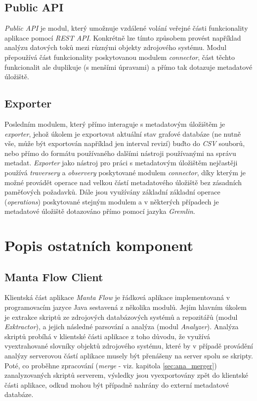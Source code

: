 \subsection{Public API}
\label{sec:ana_public}
\textit{Public API} je modul, který umožnuje vzdálené volání veřejné části funkcionality aplikace pomocí \textit{REST API}. Konkrétně lze tímto způsobem provést například analýzu datových toků mezi různými objekty zdrojového systému. Modul přepoužívá část funkcionality poskytovanou modulem \textit{connector}, část těchto funkcionalit ale duplikuje (s menšími úpravami) a přímo tak dotazuje metadatové úložiště.

\subsection{Exporter}
\label{sec:ana_exporter}
Posledním modulem, který přímo interaguje s metadatovým úložištěm je \textit{exporter}, jehož úkolem je exportovat aktuální stav grafové databáze (ne nutně vše, může být exportován například jen interval revizí) buďto do \textit{CSV} souborů, nebo přímo do formátu používaného dalšími nástroji používanými na správu metadat. \textit{Exporter} jako nástroj pro práci s metadatovým úložištěm nejčastěji používá \textit{traversery} a \textit{observery} poskytované modulem \textit{connector}, díky kterým je možné provádět operace nad velkou částí metadatového úložiště bez zásadních paměťových požadavků. Dále jsou využívány základní základní operace (\textit{operations}) poskytované stejným modulem a v některých případech je metadatové úložiště dotazováno přímo pomocí jazyka \textit{Gremlin}.


\section{Popis ostatních komponent}
\label{sec:ana_other}
\subsection{Manta Flow Client}
\label{sec:ana_cli}
Klientská část aplikace \textit{Manta Flow} je řádková aplikace implementovaná v programovacím jazyce Java sestavená z několika modulů. Jejím hlavním úkolem je extrakce skriptů ze zdrojových databázových systémů a repozitářů (modul \textit{Exktractor}), a jejich následné parsování a analýza (modul \textit{Analyzer}). Analýza skriptů probíhá v klientské části aplikace z toho důvodu, že využívá vyextrahované slovníky objektů zdrojového systému, které by v případě provádění analýzy serverovou částí aplikace musely být přenášeny na server spolu se skripty. Poté, co proběhne zpracování (\textit{merge} - viz. kapitola \ref{sec:ana_merger}) zanalyzovaných skriptů serverem, výsledky jsou vyexportovány zpět do klientské části aplikace, odkud mohou být případně nahrány do externí metadatové databáze.

